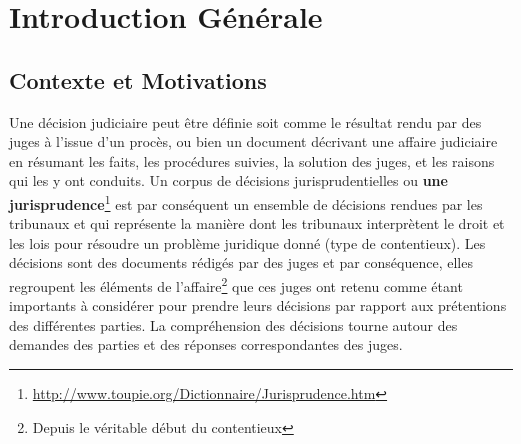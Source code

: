 %
\chapter*{Introduction Générale}
\label{chap:intro}

\section{Contexte et Motivations}
\label{sec:intro:contexte}
Une décision judiciaire peut être définie soit comme  le résultat rendu par des juges à l'issue d'un procès, ou bien un document décrivant une affaire judiciaire en résumant les faits, les procédures suivies, la solution des juges, et les raisons qui les y ont conduits. Un corpus de décisions jurisprudentielles ou \textbf{une jurisprudence}\footnote{\url{http://www.toupie.org/Dictionnaire/Jurisprudence.htm}} est par conséquent un ensemble de décisions rendues par les tribunaux et qui représente la manière dont les tribunaux interprètent le droit et les lois pour résoudre un problème juridique donné (type de contentieux). Les décisions sont des documents rédigés par des juges et par conséquence, elles regroupent les éléments de l'affaire\footnote{Depuis le véritable début du contentieux} que ces juges ont retenu comme étant importants à considérer pour prendre leurs décisions par rapport aux prétentions des différentes parties. La compréhension des décisions tourne autour des demandes des parties et des réponses correspondantes des juges.

